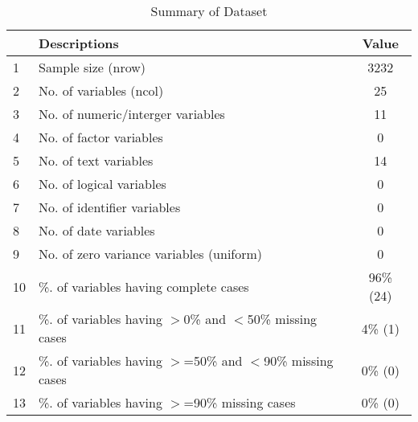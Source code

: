 \begin{table}[ht]
\centering
\caption{Summary of Dataset} 
\begin{tabular}{llc}
  \hline
 & Descriptions & Value \\ 
  \hline
1 & Sample size (nrow) & 3232 \\ 
  2 & No. of variables (ncol) & 25 \\ 
  3 & No. of numeric/interger variables & 11 \\ 
  4 & No. of factor variables & 0 \\ 
  5 & No. of text variables & 14 \\ 
  6 & No. of logical variables & 0 \\ 
  7 & No. of identifier variables & 0 \\ 
  8 & No. of date variables & 0 \\ 
  9 & No. of zero variance variables (uniform) & 0 \\ 
  10 & \%. of variables having complete cases & 96\% (24) \\ 
  11 & \%. of variables having $>$0\% and $<$50\% missing cases & 4\% (1) \\ 
  12 & \%. of variables having $>$=50\% and $<$90\% missing cases & 0\% (0) \\ 
  13 & \%. of variables having $>$=90\% missing cases & 0\% (0) \\ 
   \hline
\end{tabular}
\end{table}
